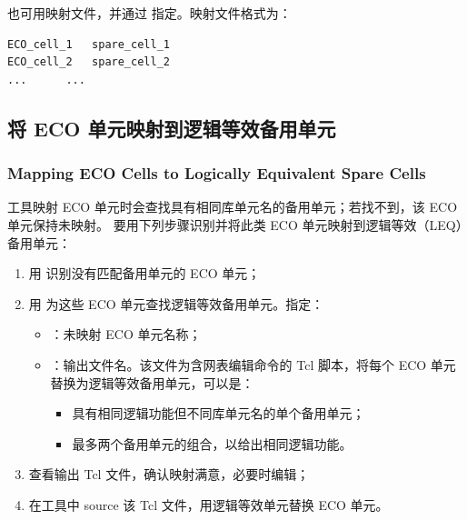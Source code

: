 也可用映射文件，并通过  指定。映射文件格式为：
\begin{lstlisting}
ECO_cell_1   spare_cell_1
ECO_cell_2   spare_cell_2
...      ...
\end{lstlisting}

\subsection{将 ECO 单元映射到逻辑等效备用单元}
\subsubsection*{Mapping ECO Cells to Logically Equivalent Spare Cells}

工具映射 ECO 单元时会查找具有相同库单元名的备用单元；若找不到，该 ECO 单元保持未映射。
要用下列步骤识别并将此类 ECO 单元映射到逻辑等效（LEQ）备用单元：
\begin{enumerate}
  \item 用  识别没有匹配备用单元的 ECO 单元；
  \item 用  为这些 ECO 单元查找逻辑等效备用单元。指定：
  \begin{itemize}
    \item {}：未映射 ECO 单元名称；
    \item {}：输出文件名。该文件为含网表编辑命令的 Tcl 脚本，将每个 ECO 单元替换为逻辑等效备用单元，可以是：
    \begin{itemize}
      \item 具有相同逻辑功能但不同库单元名的单个备用单元；
      \item 最多两个备用单元的组合，以给出相同逻辑功能。
    \end{itemize}
  \end{itemize}
  \item 查看输出 Tcl 文件，确认映射满意，必要时编辑；
  \item 在工具中 source 该 Tcl 文件，用逻辑等效单元替换 ECO 单元。
\end{enumerate}
